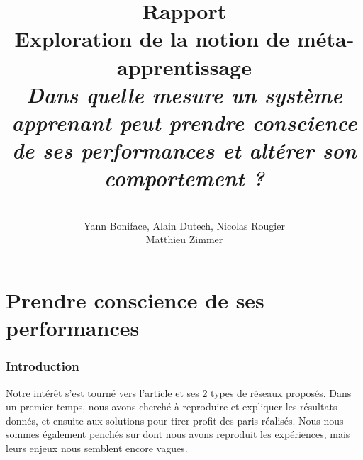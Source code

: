\documentclass[a4paper,12pt, twoside]{article}
\title{
  \textbf{Rapport}
  \\[5cm]
  Exploration de la notion de méta-apprentissage
  \\[3cm]
  \textit{
  Dans quelle mesure un système apprenant peut prendre conscience de ses performances
  et altérer son comportement ?}
}
\author{
  \\[3cm]
  Yann Boniface, Alain Dutech, Nicolas Rougier \\
  Matthieu Zimmer}
\begin{document}
\maketitle








\newpage

\part{Prendre conscience de ses performances}
\section{Introduction}

Notre intérêt s'est tourné vers l'article \cite{Cleeremans_2007} et ses 2 types de réseaux proposés.
Dans un premier temps, nous avons cherché à reproduire et expliquer les résultats
donnés, et ensuite aux solutions pour tirer profit des paris réalisés.
\newline
Nous nous sommes également penchés sur \cite{Pasquali_2010} dont nous avons reproduit
les expériences, mais leurs enjeux nous semblent encore vagues.
\end{document}
